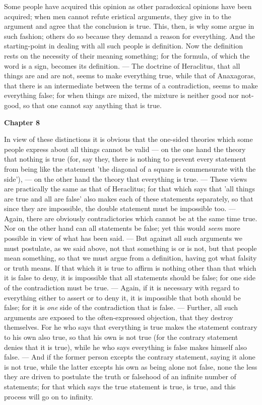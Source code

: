 Some people have acquired this opinion as other paradoxical opinions have been acquired; when men cannot refute eristical arguments, they give in to the argument and agree that the conclusion is true. This, then, is why some argue in such fashion; others do so because they demand a reason for everything. And the starting-point in dealing with all such people is definition. Now the definition rests on the necessity of their meaning something; for the formula, of which the word is a sign, becomes its definition. — The doctrine of Heraclitus, that all things are and are not, seems to make everything true, while that of Anaxagoras, that there is an intermediate between the terms of a contradiction, seems to make everything false; for when things are mixed, the mixture is neither good nor not- good, so that one cannot say anything that is true.

\textbf{Chapter 8}

In view of these distinctions it is obvious that the one-sided theories which some people express about all things cannot be valid — on the one hand the theory that nothing is true (for, say they, there is nothing to prevent every statement from being like the statement 'the diagonal of a square is commensurate with the side'), — on the other hand the theory that everything is true. — These views are practically the same as that of Heraclitus; for that which says that 'all things are true and all are false' also makes each of these statements separately, so that since they are impossible, the double statement must be impossible too. — Again, there are obviously contradictories which cannot be at the same time true. Nor on the other hand can all statements be false; yet this would \emph{seem} more possible in view of what has been said. — But against all such arguments we must postulate, as we said above, not that something is or is not, but that people mean something, so that we must argue from a definition, having got what falsity or truth means. If that which it is true to affirm is nothing other than that which it is false to deny, it is impossible that all statements should be false; for one side of the contradiction must be true. — Again, if it is necessary with regard to everything either to assert or to deny it, it is impossible that both should be false; for it is \emph{one} side of the contradiction that is false. — Further, all such arguments are exposed to the often-expressed objection, that they destroy themselves. For he who says that everything is true makes the statement contrary to his own also true, so that his own is not true (for the contrary statement denies that it is true), while he who says everything is false makes himself also false. — And if the former person excepts the contrary statement, saying it alone is not true, while the latter excepts his own as being alone not false, none the less they are driven to postulate the truth or falsehood of an infinite number of statements; for that which says the true statement is true, is true, and this process will go on to infinity.

